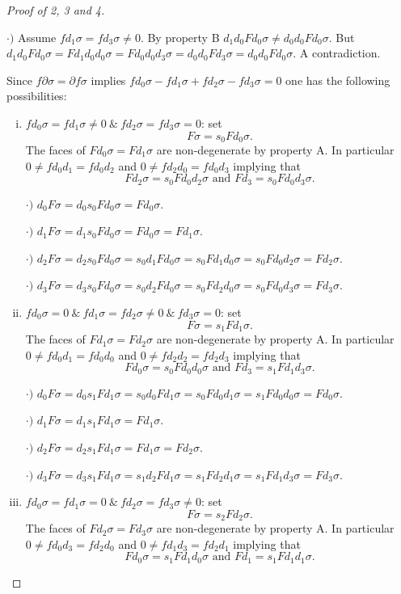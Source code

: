 \documentclass[thesis.tex]{subfiles}
\begin{document}
\begin{proof}[Proof of 2, 3 and 4]
\begin{enumerate}[a)]
    $\cdot)$ Assume $fd_1\sigma=fd_3\sigma\neq0$. By property B $d_1d_0Fd_0\sigma\neq d_0d_0Fd_0\sigma$. But $d_1d_0Fd_0\sigma=Fd_1d_0d_0\sigma=Fd_0d_0d_3\sigma=d_0d_0Fd_3\sigma=d_0d_0Fd_0\sigma$. A contradiction. \par

    Since $f\partial\sigma=\partial f\sigma$ implies $fd_0\sigma-fd_1\sigma+fd_2\sigma-fd_3\sigma=0$ one has the following possibilities:

        \begin{enumerate}[i)]

        \item \underline{$fd_0\sigma=fd_1\sigma\neq0\ \&\ fd_2\sigma=fd_3\sigma=0$}: set $$F\sigma=s_0Fd_0\sigma.$$
        The faces of $Fd_0\sigma=Fd_1\sigma$ are non-degenerate by property A. In particular $0\neq fd_0d_1=fd_0d_2$ and $0\neq fd_2d_0=fd_0d_3$ implying that $$Fd_2\sigma=s_0Fd_0d_2\sigma \text{ and } Fd_3=s_0Fd_0d_3\sigma.$$

        $\cdot)$ $d_0F\sigma=d_0s_0Fd_0\sigma=Fd_0\sigma$.

        $\cdot)$ $d_1F\sigma=d_1s_0Fd_0\sigma=Fd_0\sigma=Fd_1\sigma$.

        $\cdot)$ $d_2F\sigma=d_2s_0Fd_0\sigma=s_0d_1Fd_0\sigma=s_0Fd_1d_0\sigma=s_0Fd_0d_2\sigma=Fd_2\sigma$.

        $\cdot)$ $d_3F\sigma=d_3s_0Fd_0\sigma=s_0d_2Fd_0\sigma=s_0Fd_2d_0\sigma=s_0Fd_0d_3\sigma=Fd_3\sigma$.

        \item \underline{$fd_0\sigma=0\ \&\ fd_1\sigma=fd_2\sigma\neq0\ \&\ fd_3\sigma=0$}: set $$F\sigma=s_1Fd_1\sigma.$$
        The faces of $Fd_1\sigma=Fd_2\sigma$ are non-degenerate by property A. In particular $0\neq fd_0d_1=fd_0d_0$ and $0\neq fd_2d_2=fd_2d_3$ implying that $$Fd_0\sigma=s_0Fd_0d_0\sigma \text{ and } Fd_3=s_1Fd_1d_3\sigma.$$

        $\cdot)$ $d_0F\sigma=d_0s_1Fd_1\sigma=s_0d_0Fd_1\sigma=s_0Fd_0d_1\sigma=s_1Fd_0d_0\sigma=Fd_0\sigma$.

        $\cdot)$ $d_1F\sigma=d_1s_1Fd_1\sigma=Fd_1\sigma.$

        $\cdot)$ $d_2F\sigma=d_2s_1Fd_1\sigma=Fd_1\sigma=Fd_2\sigma$.

        $\cdot)$ $d_3F\sigma=d_3s_1Fd_1\sigma=s_1d_2Fd_1\sigma=s_1Fd_2d_1\sigma=s_1Fd_1d_3\sigma=Fd_3\sigma$.

        \item \underline{$fd_0\sigma=fd_1\sigma=0\ \&\ fd_2\sigma=fd_3\sigma\neq0$}: set $$F\sigma=s_2Fd_2\sigma.$$
        The faces of $Fd_2\sigma=Fd_3\sigma$ are non-degenerate by property A. In particular $0\neq fd_0d_3=fd_2d_0$ and $0\neq fd_1d_3=fd_2d_1$ implying that $$Fd_0\sigma=s_1Fd_1d_0\sigma\text{ and } Fd_1=s_1Fd_1d_1\sigma.$$


\end{enumerate}
\end{enumerate}
\end{proof}
\end{document}
